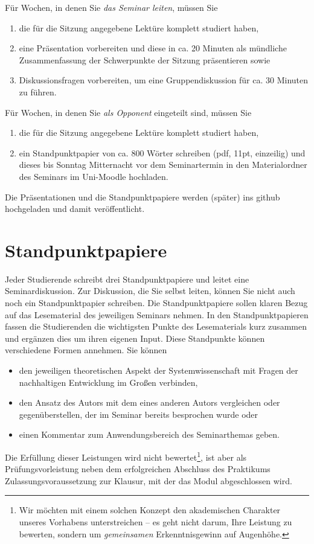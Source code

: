 \documentclass[11pt,a4paper]{article}
\begin{document}
Für Wochen, in denen Sie \emph{das Seminar leiten}, müssen Sie
\begin{enumerate}
\item die für die Sitzung angegebene Lektüre komplett studiert haben,
\item eine Präsentation vorbereiten und diese in ca. 20 Minuten als mündliche
  Zusammenfassung der Schwerpunkte der Sitzung präsentieren sowie
\item Diskussionsfragen vorbereiten, um eine Gruppendiskussion für ca. 30
  Minuten zu führen.
\end{enumerate}
Für Wochen, in denen Sie \emph{als Opponent} eingeteilt sind, müssen Sie
\begin{enumerate}
\item die für die Sitzung angegebene Lektüre komplett studiert haben, 
\item ein Standpunktpapier von ca. 800 Wörter schreiben (pdf, 11pt, einzeilig)
  und dieses bis Sonntag Mitternacht vor dem Seminartermin in den
  Materialordner des Seminars im Uni-Moodle hochladen.
\end{enumerate}

Die Präsentationen und die Standpunktpapiere werden (später) ins github
hochgeladen und damit veröffentlicht.


\section{Standpunktpapiere}

Jeder Studierende schreibt drei Standpunktpapiere und leitet eine
Seminardiskussion.  Zur Diskussion, die Sie selbst leiten, können Sie nicht
auch noch ein Standpunktpapier schreiben. Die Standpunktpapiere sollen klaren
Bezug auf das Lesematerial des jeweiligen Seminars nehmen. In den
Standpunktpapieren fassen die Studierenden die wichtigsten Punkte des
Lesematerials kurz zusammen und ergänzen dies um ihren eigenen Input. Diese
Standpunkte können verschiedene Formen annehmen. Sie können
\begin{itemize}
\item den jeweiligen theoretischen Aspekt der Systemwissenschaft mit Fragen
  der nachhaltigen Entwicklung im Großen verbinden,
\item den Ansatz des Autors mit dem eines anderen Autors vergleichen oder
  gegenüberstellen, der im Seminar bereits besprochen wurde oder
\item einen Kommentar zum Anwendungsbereich des Seminarthemas geben.
\end{itemize}
Die Erfüllung dieser Leistungen wird nicht bewertet\footnote{Wir möchten mit
  einem solchen Konzept den akademischen Charakter unseres Vorhabens
  unterstreichen -- es geht nicht darum, Ihre Leistung zu bewerten, sondern um
  \emph{gemeinsamen} Erkenntnisgewinn auf Augenhöhe.}, ist aber als
Prüfungsvorleistung neben dem erfolgreichen Abschluss des Praktikums
Zulassungsvoraussetzung zur Klausur, mit der das Modul abgeschlossen wird.
\end{document}
